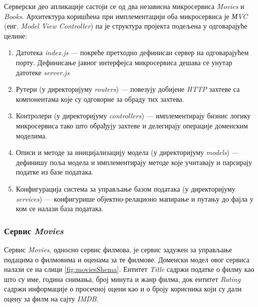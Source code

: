 \documentclass[12pt,oneside]{memoir}
\begin{document}
Серверски део апликације састоји се од два независна микросервиса \textit{Movies} и \textit{Books}. Архитектура коришћена при имплементацији оба микросервиса је \textit{МVC} (енг. \textit{Model View Controller}) па је структура пројекта подељена у одговарајуће целине:
\begin{enumerate}
\item Датотека \textit{index.js} --- покреће претходно дефинисан сервер на одговарајућем порту. Дефинисање јавног интерфејса микросервиса дешава се унутар датотеке \textit{server.js}
\item Рутери (у директоријуму \textit{routers}) --- повезују добијене \textit{HTTP} захтеве са компонентама које су одговорне за обраду тих захтева.
\item Контролери (у директоријуму \textit{controllers}) --- имплементирају бизнис логику микросервиса тако што обрађују захтеве и делегирају операције доменским моделима.
\item Описи и методе за иницијализацију модела (у директоријуму \textit{models}) ---  дефинишу поља модела и имплементирају методе које учитавају и парсирају податке из базе података.
\item Конфигурација  система за управљање базом података (у директоријуму \textit{services}) --- конфигурише објектно-релационо мапирање и путању до фајла у ком се налази база података.
\end{enumerate}


\newpage
\subsubsection{Сервис \textit{Movies}}

Сервис \textit{Movies}, односно сервис филмова, је сервис задужен за управљање подацима о филмовима и оценама за те филмове. Доменски модел овог сервиса налази се на слици \ref{fig:moviesShema}. Ентитет \textit{Title} садржи податке о филму као што су име, година снимања, број минута и жанр филма, док ентитет \textit{Rating} садржи информације о просечној оцени као и о броју корисника који су дали оцену за филм на сајту \textit{IMDB}.
\end{document}

